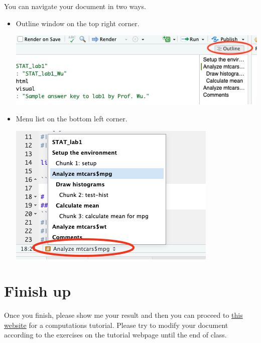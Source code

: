 \documentclass[12pt]{article}
\begin{document}
You can navigate your document in two ways.
\begin{itemize}
    \item Outline window on the top right corner.
    \begin{center}
        \includegraphics[scale=.7]{outline.png}
    \end{center}
    \item Menu list on the bottom left corner. 
        \begin{center}
        \includegraphics[scale=.7]{menu.png}
    \end{center}
\end{itemize}
\section{Finish up}
Once you finish, please show me your result and then you can proceed to \href{https://quarto.org/docs/get-started/computations/rstudio.html}{this website} for a computations tutorial. Please try to modify your document according to the exercises on the
tutorial webpage until the end of class.
\end{document}
